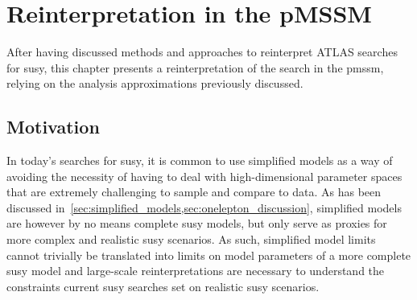 


\chapter{Reinterpretation in the pMSSM}\label{ch:pmssm}

\ifpdf
    \graphicspath{{chapter-pmssm/Figs/Raster/}{chapter-pmssm/Figs/PDF/}{chapter-pmssm/Figs/}}
\else
    \graphicspath{{chapter-pmssm/Figs/Vector/}{chapter-pmssm/Figs/}}
\fi

After having discussed methods and approaches to reinterpret ATLAS searches for \gls{susy}, this chapter presents a reinterpretation of the \onelepton search in the \gls{pmssm}, relying on the analysis approximations previously discussed.

\section{Motivation}

In today's searches for \gls{susy}, it is common to use simplified models as a way of avoiding the necessity of having to deal with high-dimensional parameter spaces that are extremely challenging to sample and compare to data.
As has been discussed in~\cref{sec:simplified_models,sec:onelepton_discussion}, simplified models are however by no means complete \gls{susy} models, but only serve as proxies for more complex and realistic \gls{susy} scenarios. As such, simplified model limits cannot trivially be translated into limits on model parameters of a more complete \gls{susy} model and large-scale reinterpretations are necessary to understand the constraints current \gls{susy} searches set on realistic \gls{susy} scenarios. 

